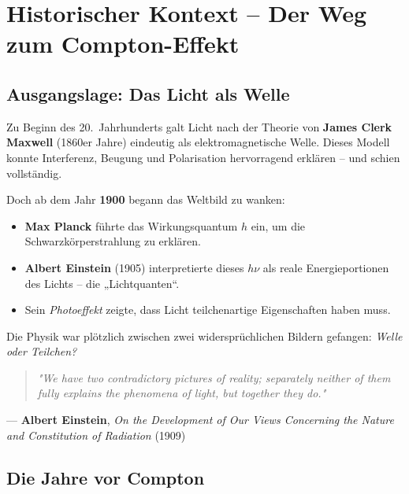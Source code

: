 \section{Historischer Kontext – Der Weg zum Compton-Effekt}

\subsection{Ausgangslage: Das Licht als Welle}

Zu Beginn des 20.~Jahrhunderts galt Licht nach der Theorie von \textbf{James Clerk Maxwell} (1860er Jahre) eindeutig als elektromagnetische Welle. 
Dieses Modell konnte Interferenz, Beugung und Polarisation hervorragend erklären – und schien vollständig.

Doch ab dem Jahr \textbf{1900} begann das Weltbild zu wanken:

\begin{itemize}
	\item \textbf{Max Planck} führte das Wirkungsquantum \( h \) ein, um die Schwarzkörperstrahlung zu erklären.
	\item \textbf{Albert Einstein} (1905) interpretierte dieses \( h\nu \) als reale Energieportionen des Lichts – die „Lichtquanten“.
	\item Sein \emph{Photoeffekt} zeigte, dass Licht teilchenartige Eigenschaften haben muss.
\end{itemize}

Die Physik war plötzlich zwischen zwei widersprüchlichen Bildern gefangen: 
\emph{Welle oder Teilchen?}
\vspace{1em}
\begin{HistoryBox}
	\begin{quote}
		\emph{"We have two contradictory pictures of reality; separately neither of them fully explains the phenomena of light, but together they do."}
	\end{quote}
	
	\hfill --- \textbf{Albert Einstein}, \emph{On the Development of Our Views Concerning the Nature and Constitution of Radiation} (1909)
	\label{box:Einstein1909}
\end{HistoryBox}



\vspace{1em}
\subsection{Die Jahre vor Compton}

